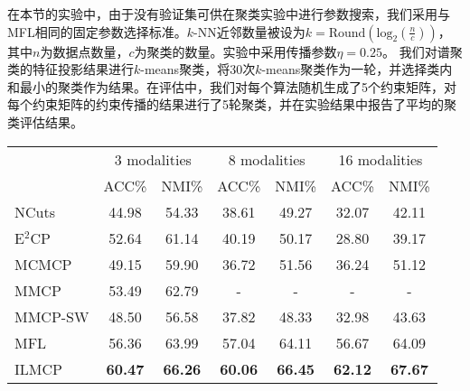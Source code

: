 在本节的实验中，由于没有验证集可供在聚类实验中进行参数搜索，我们采用与MFL相同的固定参数选择标准。$k$-NN近邻数量被设为$ k = \mathrm{Round}(\mathrm{log}_2(\frac{n}{c}))$，其中$ n $为数据点数量，$ c $为聚类的数量。实验中采用传播参数$\eta = 0.25$。
我们对谱聚类的特征投影结果进行$k$-means聚类，将30次$k$-means聚类作为一轮，并选择类内和最小的聚类作为结果。在评估中，我们对每个算法随机生成了5个约束矩阵，对每个约束矩阵的约束传播的结果进行了5轮聚类，并在实验结果中报告了平均的聚类评估结果。



\begin{table}[t]
    \label{tab4:modal}
    \centering
    \setlength{\tabcolsep}{8pt}
    \begin{tabular}{l*{6}{c}}
        \toprule
        &\multicolumn{2}{c}{3 modalities} & \multicolumn{2}{c}{8 modalities} & \multicolumn{2}{c}{16 modalities}\\
        \cmidrule(lr){2-3}
        \cmidrule(lr){4-5}
        \cmidrule(lr){6-7}
        & ACC\% & NMI\% & ACC\% & NMI\% & ACC\% & NMI\% \\
        \midrule
        NCuts\cite{shi2000normalized} & 44.98 & 54.33 & 38.61 & 49.27 & 32.07 & 42.11 \\ 
        E$^2$CP\cite{lu2010constrained} & 52.64 & 61.14 & 40.19 & 50.17 & 28.80 & 39.17 \\ 
        MCMCP\cite{fu2012modalities} & 49.15 & 59.90 & 36.72 & 51.56 & 36.24 & 51.12 \\ 
        MMCP\cite{fu2011multi} & 53.49 & 62.79 & - & - & - & - \\ 
        MMCP-SW\cite{fu2011multi} & 48.50 & 56.58 & 37.82 & 48.33 & 32.98 & 43.63 \\ 
        MFL & {56.36} & {63.99} & {57.04} & {64.11} & {56.67} &{ 64.09}\\
        ILMCP & \textbf{60.47} & \textbf{66.26} & \textbf{60.06} & \textbf{66.45 } & \textbf{62.12} &\textbf{ 67.67} \\
        \bottomrule
    \end{tabular}
\end{table}


